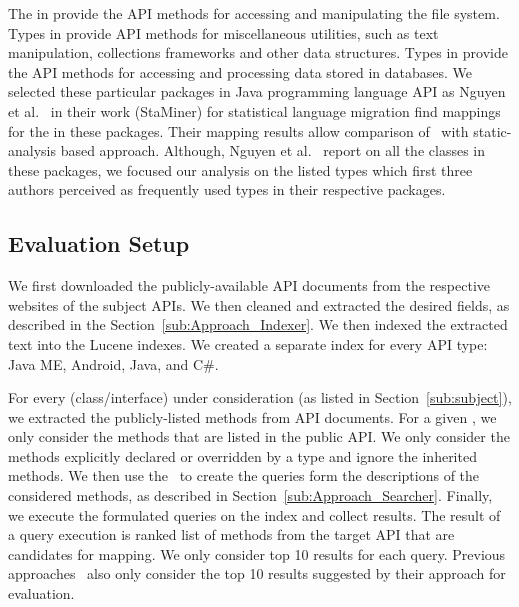 The  in  provide the API methods for accessing and manipulating the file system.
Types in  provide API methods for miscellaneous utilities, such as text manipulation, collections frameworks and other data structures.
Types in  provide the API methods for accessing and processing data stored in databases.
We selected these particular packages in Java programming language API as Nguyen et al.~\cite{nguyen2014statistical} in their work (StaMiner) for statistical language migration find mappings for the  in these packages.
Their mapping results allow comparison of \tool\ with static-analysis based approach.
Although, Nguyen et al.~\cite{nguyen2014statistical} report on all the classes in these packages, we focused our analysis on the listed types which first three authors perceived as frequently used types in their respective packages.


\subsection{Evaluation Setup}


We first downloaded the publicly-available API documents from the respective websites of the subject APIs. We then cleaned and extracted the desired fields, as described in the Section~\ref{sub:Approach_Indexer}. We then indexed the extracted text into the Lucene indexes.
We created a separate index for every API type: Java ME, Android, Java, and C\#. 


For every  (class/interface) under consideration (as listed in Section~\ref{sub:subject}),
we extracted the publicly-listed methods from API documents.
For a given , we only consider the methods that are listed in the public API.
We only consider the methods explicitly declared or overridden by a type and ignore the inherited methods.
We then use the \tool\ to create the queries form the descriptions of the considered methods, as described in Section~\ref{sub:Approach_Searcher}.
Finally, we execute the formulated queries on the index and collect results.
The result of a query execution is ranked list of methods from the target API that are candidates for mapping.
We only consider top 10 results for each query.
Previous approaches~\cite{chatterjee2009sniff,Gokhale2013ICSE}
also only consider the top 10 results suggested by their approach for evaluation.



